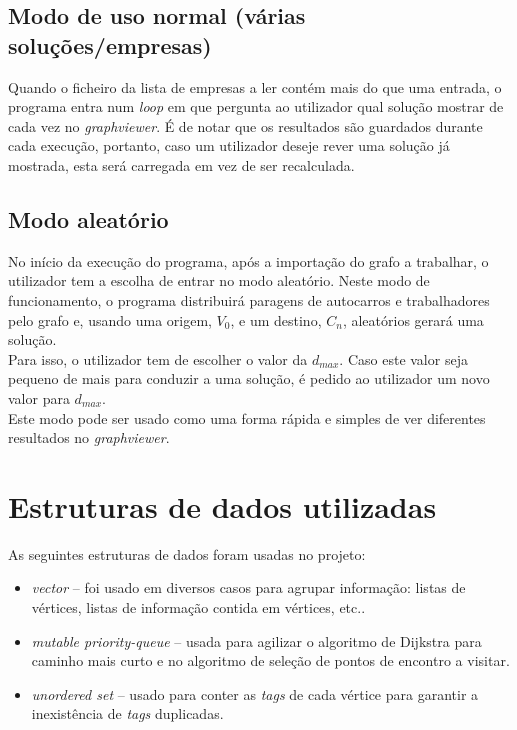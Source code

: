 \documentclass{report}
\begin{document}
 \section{Modo de uso normal (várias soluções/empresas)}
    Quando o ficheiro da lista de empresas a ler contém mais do que uma entrada,
    o programa entra num \textit{loop} em que pergunta ao utilizador qual solução
    mostrar de cada vez no \textit{graphviewer}. É de notar que os resultados são
    guardados durante cada execução, portanto, caso um utilizador deseje rever uma
    solução já mostrada, esta será carregada em vez de ser recalculada.

  \section{Modo aleatório}
    No início da execução do programa, após a importação do grafo a trabalhar,
    o utilizador tem a escolha de entrar no modo aleatório. Neste modo de
    funcionamento, o programa distribuirá paragens de autocarros e trabalhadores
    pelo grafo e, usando uma origem, $V_0$, e um destino, $C_n$, aleatórios
    gerará uma solução.\\
    Para isso, o utilizador tem de escolher o valor da $d_{max}$. Caso este
    valor seja pequeno de mais para conduzir a uma solução, é pedido ao
    utilizador um novo valor para $d_{max}$.\\
    Este modo pode ser usado como uma forma rápida e simples de ver diferentes
    resultados no \textit{graphviewer}.

\chapter{Estruturas de dados utilizadas}
  As seguintes estruturas de dados foram usadas no projeto:
  \begin{itemize}
  \item \textit{vector} -- foi usado em diversos casos para agrupar informação: listas
    de vértices, listas de informação contida em vértices, etc..
  \item \textit{mutable priority-queue} -- usada para agilizar o algoritmo de Dijkstra para
    caminho mais curto e no algoritmo de seleção de pontos de encontro a visitar.
  \item \textit{unordered set} -- usado para conter as \textit{tags} de cada vértice para
    garantir a inexistência de \textit{tags} duplicadas.
  \end{itemize}
\end{document}
